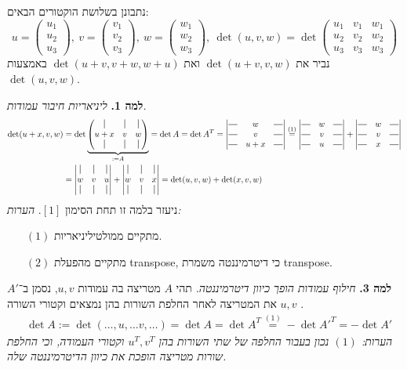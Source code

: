 \documentclass[]{article}
\newcommand\pms[1]    {\begin{pmatrix}
		#1
\end{pmatrix}}
\newcommand\dms[1]    {\left\vert\begin{matrix}
		#1
\end{matrix}\right\vert}
\newcommand*{\vertbar}{\rule[-.5ex]{0.5pt}{2.5ex}}
\newcommand*{\horzbar}{\rule[.5ex]{2.5ex}{0.5pt}}
\begin{document}
	\section{}
	נתבונן בשלושת הוקטורים הבאים: 
	\[ u = \pms{u_1 \\ u_2 \\ u_3}, \ v = \pms{v_1 \\ v_2 \\ v_3}, \ w = \pms{w_1 \\ w_2 \\ w_3}, \ \det(u, v, w) = \det\pms{u_1 & v_1 & w_1 \\ u_2 & v_2 & w_2 \\ u_3 & v_3 & w_3} \]
	נביר את $\det(u + v, v, w)$ ואת $\det(u + v, v + w, w + u)$ באמצעות $\det(u, v, w)$. 
	
	\textbf{למה 1. }\textit{ליניאריות חיבור עמודות. }
	\begin{align*}
		\det(u + x, v, w) &= \det\underbrace{\pms{\vertbar & \vertbar & \vertbar \\ u + x & v & w \\ \vertbar & \vertbar & \vertbar}}_{:=A} = \det A = \det A^T =
		\dms{\horzbar & w & \horzbar \\ \horzbar & v & \horzbar \\ \horzbar & u + x & \horzbar}
		\overset{(1)}{=}
		\dms{\horzbar & w & \horzbar \\ \horzbar & v & \horzbar \\ \horzbar & u & \horzbar}
		+ \dms{\horzbar & w & \horzbar \\ \horzbar & v & \horzbar \\ \horzbar & x & \horzbar} \\
		&= \dms{\vertbar & \vertbar & \vertbar \\ w & v & u \\ \vertbar & \vertbar & \vertbar}
		+ \dms{\vertbar & \vertbar & \vertbar \\ w & v & x \\ \vertbar & \vertbar & \vertbar}
		 = \det(u, v, w) + \det(x, v, w)
	\end{align*}
	ניעזר בלמה זו תחת הסימון $[1]$. \textit{הערות: }
	\begin{enumerate}
		\item[$(1)$] מתקיים ממולטיליניאריות. 
		\item[$(2)$] מתקיים מהפעלת transpose, כי דיטרמיננטה משמרת transpose. 
	\end{enumerate}
	\textbf{למה 3. }\textit{חילוף עמודות הופך כיוון דיטרמיננטה. }תהי $A$ מטריצה בה עמודות $u, v$, נסמן ב־$A'$ את המטריצה לאחר החלפת השורות בהן נמצאים וקטורי השורה $u, v$ .
	\begin{align*}
		&\det A := \det(\dots, u, \dots v, \dots) = \det A = \det A^T \overset{(1)}{=} -\det A'^T = -\det A' 
	\end{align*}
	\textit{הערות: $(1)$ נכון בעבור החלפה של שתי השורות בהן $u^T, v^T$ וקטורי העמודה, וכי החלפת שורות מטריצה הופכת את כיוון הדיטרמיננטה שלה. }
	
\end{document}

